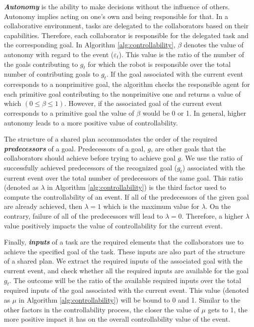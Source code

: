 \documentclass{article}
\begin{document}
\textit{\textbf{Autonomy}} is the ability to make decisions without the
influence of others. Autonomy implies acting on one's own and being responsible
for that. In a collaborative environment, tasks are delegated to the
collaborators based on their capabilities. Therefore, each collaborator is
responsible for the delegated task and the corresponding goal. In Algorithm
\ref{alg:controllability}, $\beta$ denotes the value of autonomy with regard to
the event ($\varepsilon_t$). This value is the ratio of the number of the goals
contributing to $\mathit{g}_{t}$ for which the robot is responsible over the
total number of contributing goals to $\mathit{g}_{t}$. If the goal associated
with the current event corresponds to a nonprimitive goal, the algorithm checks
the responsible agent for each primitive goal contributing to the nonprimitive
one and returns a value of which $(0 \leq \beta \leq 1)$. However, if the
associated goal of the current event corresponds to a primitive goal the value
of $\beta$ would be 0 or 1. In general, higher autonomy leads to a more positive
value of controllability.

The structure of a shared plan accommodates the order of the required
\textit{\textbf{predecessors}} of a goal. Predecessors of a goal, $g$, are other
goals that the collaborators should achieve before trying to achieve goal $g$.
We use the ratio of successfully achieved predecessors of the recognized goal
($\mathit{g}_{t}$) associated with the current event over the total number of
predecessors of the same goal. This ratio (denoted as $\lambda$ in Algorithm
\ref{alg:controllability}) is the third factor used to compute the
controllability of an event. If all of the predecessors of the given goal are
already achieved, then $\lambda=1$ which is the maximum value for $\lambda$. On
the contrary, failure of all of the predecessors will lead to $\lambda=0$.
Therefore, a higher $\lambda$ value positively impacts the value of
controllability for the current event.

Finally, \textit{\textbf{inputs}} of a task are the required elements that the
collaborators use to achieve the specified goal of the task. These inputs are
also part of the structure of a shared plan. We extract the required inputs of
the associated goal with the current event, and check whether all the required
inputs are available for the goal $\mathit{g}_{t}$. The outcome will be the
ratio of the available required inputs over the total required inputs of the
goal associated with the current event. This value (denoted as $\mu$ in
Algorithm \ref{alg:controllability}) will be bound to 0 and 1. Similar to the
other factors in the controllability process, the closer the value of $\mu$ gets
to 1, the more positive impact it has on the overall controllability value of
the event.
\end{document}
